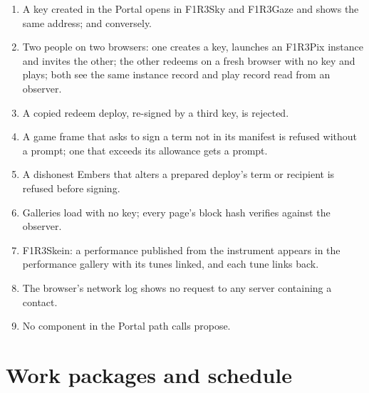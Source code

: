 \documentclass[11pt]{article}
\theoremstyle{definition}
\theoremstyle{remark}
\newcommand{\Em}{Embers}
\newcommand{\Sky}{F1R3Sky}
\newcommand{\Gz}{F1R3Gaze}
\begin{document}
\begin{enumerate}[leftmargin=*,itemsep=2pt]
\item A key created in the Portal opens in \Sky{} and \Gz{} and shows the same
  address; and conversely.
\item Two people on two browsers: one creates a key, launches an F1R3Pix instance and
  invites the other; the other redeems on a fresh browser with no key and plays; both
  see the same instance record and play record read from an observer.
\item A copied redeem deploy, re-signed by a third key, is rejected.
\item A game frame that asks to sign a term not in its manifest is refused without a
  prompt; one that exceeds its allowance gets a prompt.
\item A dishonest \Em{} that alters a prepared deploy's term or recipient is
  refused before signing.
\item Galleries load with no key; every page's block hash verifies against the
  observer.
\item F1R3Skein: a performance published from the instrument appears in the
  performance gallery with its tunes linked, and each tune links back.
\item The browser's network log shows no request to any server containing a
  contact.
\item No component in the Portal path calls propose.
\end{enumerate}

\section{Work packages and schedule}\label{sec:plan}
\end{document}
